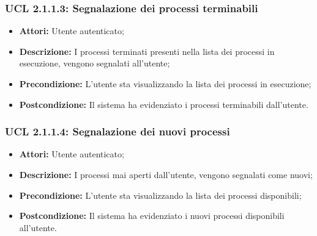 \subsubsection{UCL 2.1.1.3: Segnalazione dei processi terminabili}
\begin{itemize}
\item \textbf{Attori:} Utente autenticato;
\item \textbf{Descrizione:} I processi terminati presenti nella lista dei processi in esecuzione, vengono segnalati all'utente;
\item \textbf{Precondizione:} L'utente sta visualizzando la lista dei processi in esecuzione;
\item \textbf{Postcondizione:} Il sistema ha evidenziato i processi terminabili dall'utente.
\end{itemize}

\hypertarget{L2.1.1.4}{}
\subsubsection{UCL 2.1.1.4: Segnalazione dei nuovi processi}
\begin{itemize}
\item \textbf{Attori:} Utente autenticato;
\item \textbf{Descrizione:} I processi mai aperti dall'utente, vengono segnalati come nuovi;
\item \textbf{Precondizione:} L'utente sta visualizzando la lista dei processi disponibili;
\item \textbf{Postcondizione:} Il sistema ha evidenziato i nuovi processi disponibili all'utente.
\end{itemize}

\hypertarget{L2.1.2}{}
